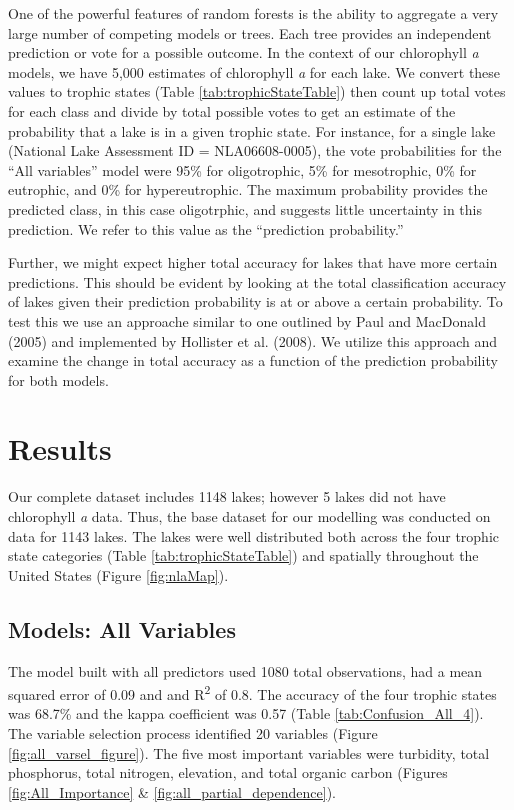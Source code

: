 \documentclass[11pt,]{article}
\begin{document}
One of the powerful features of random forests is the ability to
aggregate a very large number of competing models or trees. Each tree
provides an independent prediction or vote for a possible outcome. In
the context of our chlorophyll \emph{a} models, we have 5,000 estimates
of chlorophyll \emph{a} for each lake. We convert these values to
trophic states (Table \ref {tab:trophicStateTable}) then count up total
votes for each class and divide by total possible votes to get an
estimate of the probability that a lake is in a given trophic state. For
instance, for a single lake (National Lake Assessment ID =
NLA06608-0005), the vote probabilities for the ``All variables'' model
were 95\% for oligotrophic, 5\% for mesotrophic, 0\% for eutrophic, and
0\% for hypereutrophic. The maximum probability provides the predicted
class, in this case oligotrphic, and suggests little uncertainty in this
prediction. We refer to this value as the ``prediction probability.''

Further, we might expect higher total accuracy for lakes that have more
certain predictions. This should be evident by looking at the total
classification accuracy of lakes given their prediction probability is
at or above a certain probability. To test this we use an approache
similar to one outlined by Paul and MacDonald (2005) and implemented by
Hollister et al. (2008). We utilize this approach and examine the change
in total accuracy as a function of the prediction probability for both
models.

\section{Results}\label{results}

Our complete dataset includes 1148 lakes; however 5 lakes did not have
chlorophyll \emph{a} data. Thus, the base dataset for our modelling was
conducted on data for 1143 lakes. The lakes were well distributed both
across the four trophic state categories (Table
\ref{tab:trophicStateTable}) and spatially throughout the United States
(Figure \ref{fig:nlaMap}).

\subsection{Models: All Variables}\label{models-all-variables}

The model built with all predictors used 1080 total observations, had a
mean squared error of 0.09 and and R\textsuperscript{2} of 0.8. The
accuracy of the four trophic states was 68.7\% and the kappa coefficient
was 0.57 (Table \ref{tab:Confusion_All_4}). The variable selection
process identified 20 variables (Figure \ref{fig:all_varsel_figure}).
The five most important variables were turbidity, total phosphorus,
total nitrogen, elevation, and total organic carbon (Figures
\ref{fig:All_Importance} \& \ref{fig:all_partial_dependence}).
\end{document}
